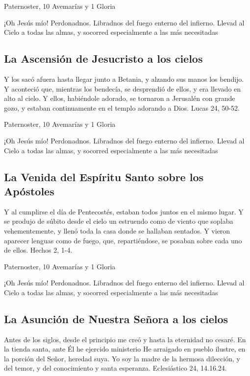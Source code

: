 \documentclass[a4paper,11pt, oneside]{report}
\begin{document}
         Paternoster, 10 Avemarías y 1 Gloria
        
        \medskip
        ¡Oh Jesús mío! Perdonadnos. Libradnos del fuego enterno del infierno. Llevad al Cielo a todas las almas, y socorred especialmente a las más 
        necesitadas
      
      \subsection*{La Ascensión de Jesucristo a los cielos}
        Y los sacó afuera hasta llegar junto a Betania, y alzando sus manos los bendijo. Y aconteció que, mientras los bendecía, se desprendió de ellos,
        y era llevado en alto al cielo. Y ellos, habiéndole adorado, se tornaron a Jerusalén con grande gozo, y estaban continuamente en el templo
        adorando a Dios. Lucas 24, 50-52.

         Paternoster, 10 Avemarías y 1 Gloria
        
        \medskip
        ¡Oh Jesús mío! Perdonadnos. Libradnos del fuego enterno del infierno. Llevad al Cielo a todas las almas, y socorred especialmente a las más 
        necesitadas
        
      \subsection*{La Venida del Espíritu Santo sobre los Apóstoles}
        Y al cumplirse el día de Pentecostés, estaban todos juntos en el mismo lugar. Y se produjo de súbito desde el cielo un estruendo como de viento
        que soplaba vehementemente, y llenó toda la casa donde se hallaban sentados. Y vieron aparecer lenguas como de fuego, que, repartiéndose, se 
        posaban sobre cada uno de ellos. Hechos 2, 1-4.

         Paternoster, 10 Avemarías y 1 Gloria
        
        \medskip
        ¡Oh Jesús mío! Perdonadnos. Libradnos del fuego enterno del infierno. Llevad al Cielo a todas las almas, y socorred especialmente a las más 
        necesitadas

      \subsection*{La Asunción de Nuestra Señora a los cielos}
        Antes de los siglos, desde el principio me creó y hasta la eternidad no cesaré. En la tienda santa, ante Él he ejercido ministerio
        He arraigado en pueblo ilustre, en la porción del Señor, heredad suya. Yo soy la madre de la hermosa dilección, y del temor, y del
        conocimiento y santa esperanza. Eclesiástico 24, 14.16.24.
\end{document}

